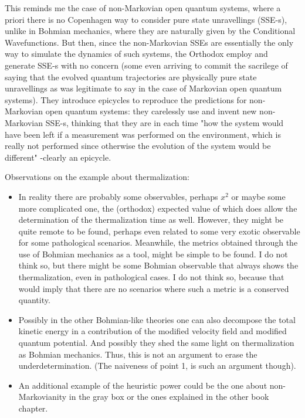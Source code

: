 \documentclass[11pt, a4paper]{article} %
\DeclareRobustCommand{\mybox}[2][gray!10]{%
\begin{tcolorbox}[   %
        left=0.2cm,
        right=0.2cm,
        top=0.15cm,
        bottom=0.15cm,
        colback=#1,
        colframe=#1,
        width=\dimexpr\textwidth\relax, 
        enlarge left by=0mm,
        boxsep=5pt,
        arc=0pt,outer arc=0pt,
        ]
        #2
\end{tcolorbox}
}
\begin{document}
\mybox{This reminds me the case of non-Markovian open quantum systems, where a priori there is no Copenhagen way to consider pure state unravellings (SSE-s), unlike in Bohmian mechanics, where they are naturally given by the Conditional Wavefunctions. But then, since the non-Markovian SSEs are essentially the only way to simulate the dynamics of such systems, the Orthodox employ and generate SSE-s with no concern (some even arriving to commit the sacrilege of saying that the evolved quantum trajectories are physically pure state unravellings as was legitimate to say in the case of Markovian open quantum systems). They introduce epicycles to reproduce the predictions for non-Markovian open quantum systems: they carelessly use and invent new non-Markovian SSE-s, thinking that they are in each time "how the system would have been left if a measurement was performed on the environment, which is really not performed since otherwise the evolution of the system would be different" -clearly an epicycle.}

Observations on the example about thermalization:
\begin{itemize}
\item In reality there are probably some observables, perhaps $x^2$ or maybe some more complicated one, the (orthodox) expected value of which does allow the determination of the thermalization time as well. However, they might be quite remote to be found, perhaps even related to some very exotic observable for some pathological scenarios. Meanwhile, the metrics  obtained through the use of Bohmian mechanics as a tool, might be simple to be found. I do not think so, but there might be some Bohmian observable that always shows the thermalization, even in pathological cases. I do not think so, because that would imply that there are no scenarios where such a metric is a conserved quantity.

\item Possibly in the other Bohmian-like theories one can also decompose the total kinetic energy in a contribution of the modified velocity field and modified quantum potential. And possibly they shed the same light on thermalization as Bohmian mechanics. Thus, this is not an argument to erase the underdetermination. (The naiveness of point 1, is such an argument though).

\item An additional example of the heuristic power could be the one about non-Markovianity in the gray box or the ones explained in the other book chapter.

\end{itemize}
\end{document}
